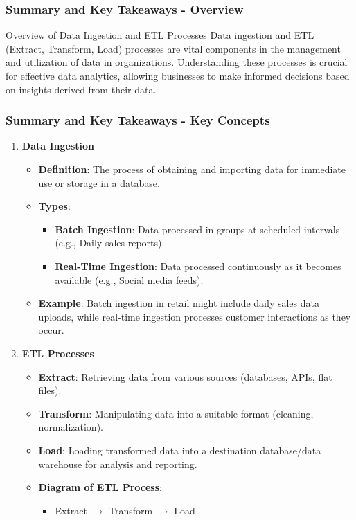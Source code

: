 \documentclass[aspectratio=169]{beamer}
\begin{document}
\begin{frame}[fragile]
    \frametitle{Summary and Key Takeaways - Overview}
    \begin{block}{Overview of Data Ingestion and ETL Processes}
        Data ingestion and ETL (Extract, Transform, Load) processes are vital components in the management and utilization of data in organizations. Understanding these processes is crucial for effective data analytics, allowing businesses to make informed decisions based on insights derived from their data.
    \end{block}
\end{frame}

\begin{frame}[fragile]
    \frametitle{Summary and Key Takeaways - Key Concepts}
    \begin{enumerate}
        \item \textbf{Data Ingestion}
            \begin{itemize}
                \item \textbf{Definition}: The process of obtaining and importing data for immediate use or storage in a database.
                \item \textbf{Types}:
                    \begin{itemize}
                        \item \textbf{Batch Ingestion}: Data processed in groups at scheduled intervals (e.g., Daily sales reports).
                        \item \textbf{Real-Time Ingestion}: Data processed continuously as it becomes available (e.g., Social media feeds).
                    \end{itemize}
                \item \textbf{Example}: Batch ingestion in retail might include daily sales data uploads, while real-time ingestion processes customer interactions as they occur.
            \end{itemize}
        \item \textbf{ETL Processes}
            \begin{itemize}
                \item \textbf{Extract}: Retrieving data from various sources (databases, APIs, flat files).
                \item \textbf{Transform}: Manipulating data into a suitable format (cleaning, normalization).
                \item \textbf{Load}: Loading transformed data into a destination database/data warehouse for analysis and reporting.
                \item \textbf{Diagram of ETL Process}:
                    \begin{itemize}
                        \item Extract $\rightarrow$ Transform $\rightarrow$ Load
                    \end{itemize}
            \end{itemize}
    \end{enumerate}
\end{frame}
\end{document}
